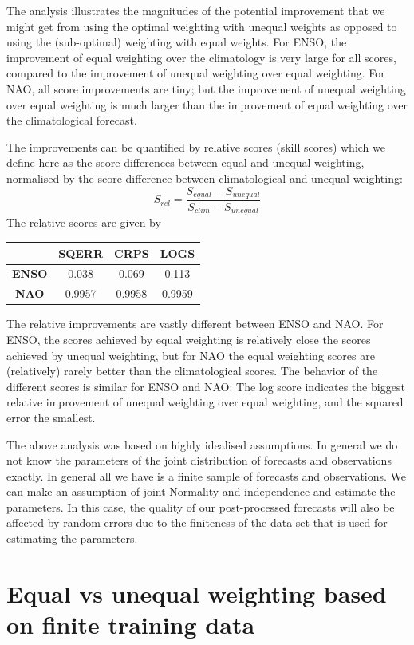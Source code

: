 \documentclass[12pt]{article}
\begin{document}
The analysis illustrates the magnitudes of the potential improvement that we might get from using the optimal weighting with unequal weights as opposed to using the (sub-optimal) weighting with equal weights. 
For ENSO, the improvement of equal weighting over the climatology is very large for all scores, compared to the improvement of unequal weighting over equal weighting.
For NAO, all score improvements are tiny; but the improvement of unequal weighting over equal weighting is much larger than the improvement of equal weighting over the climatological forecast.

The improvements can be quantified by relative scores (skill scores) which we define here as the score differences between equal and unequal weighting, normalised by the score difference between climatological and unequal weighting:
%
\begin{equation}
S_{rel} = \frac{S_{equal} - S_{unequal}}{S_{clim} - S_{unequal}}
\end{equation}
%
The relative scores are given by
%
\begin{center}
\begin{tabular}{c|ccc}
& SQERR & CRPS &  LOGS \\
\hline
\textbf{ENSO} & 0.038 & 0.069 & 0.113 \\
\textbf{NAO} & 0.9957 & 0.9958 & 0.9959 
\end{tabular}
\end{center}

The relative improvements are vastly different between ENSO and NAO.
For ENSO, the scores achieved by equal weighting is relatively close the scores achieved by unequal weighting, but for NAO the equal weighting scores are (relatively) rarely better than the climatological scores.
The behavior of the different scores is similar for ENSO and NAO: The log score indicates the biggest relative improvement of unequal weighting over equal weighting, and the squared error the smallest.


The above analysis was based on highly idealised assumptions.
In general we do not know the parameters of the joint distribution of forecasts and observations exactly.
In general all we have is a finite sample of forecasts and observations.
We can make an assumption of joint Normality and independence and estimate the parameters.
In this case, the quality of our post-processed forecasts will also be affected by random errors due to the finiteness of the data set that is used for estimating the parameters.

\section{Equal vs unequal weighting based on finite training data}
\end{document}
